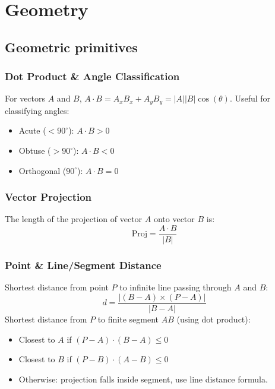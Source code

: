 \chapter{Geometry}

\section{Geometric primitives}

	\columnbreak

	\subsection{Dot Product \& Angle Classification}
		For vectors $A$ and $B$, $A \cdot B = A_x B_x + A_y B_y = |A||B|\cos(\theta)$.
		Useful for classifying angles:
		\begin{itemize}
			\item Acute ($< 90^\circ$): $A \cdot B > 0$
			\item Obtuse ($> 90^\circ$): $A \cdot B < 0$
			\item Orthogonal ($90^\circ$): $A \cdot B = 0$
		\end{itemize}

	\subsection{Vector Projection}
		The length of the projection of vector $A$ onto vector $B$ is:
		\[ \text{Proj} = \frac{A \cdot B}{|B|} \]

	\subsection{Point \& Line/Segment Distance}
		Shortest distance from point $P$ to infinite line passing through $A$ and $B$:
		\[ d = \frac{|(B-A) \times (P-A)|}{|B-A|} \]
		Shortest distance from $P$ to finite segment $AB$ (using dot product):
		\begin{itemize}
			\item Closest to $A$ if $(P-A) \cdot (B-A) \le 0$
			\item Closest to $B$ if $(P-B) \cdot (A-B) \le 0$
			\item Otherwise: projection falls inside segment, use line distance formula.
		\end{itemize}

